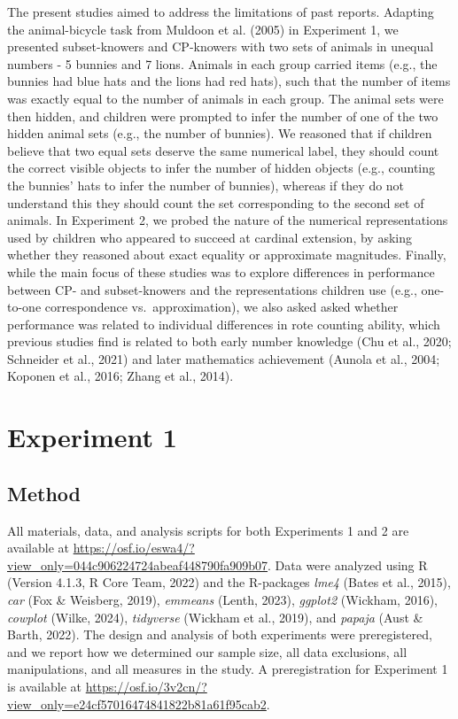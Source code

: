 \documentclass[
  man,floatsintext]{apa7}
\begin{document}
The present studies aimed to address the limitations of past reports. Adapting the animal-bicycle task from Muldoon et al. (2005) in Experiment 1, we presented subset-knowers and CP-knowers with two sets of animals in unequal numbers - 5 bunnies and 7 lions. Animals in each group carried items (e.g., the bunnies had blue hats and the lions had red hats), such that the number of items was exactly equal to the number of animals in each group. The animal sets were then hidden, and children were prompted to infer the number of one of the two hidden animal sets (e.g., the number of bunnies). We reasoned that if children believe that two equal sets deserve the same numerical label, they should count the correct visible objects to infer the number of hidden objects (e.g., counting the bunnies' hats to infer the number of bunnies), whereas if they do not understand this they should count the set corresponding to the second set of animals. In Experiment 2, we probed the nature of the numerical representations used by children who appeared to succeed at cardinal extension, by asking whether they reasoned about exact equality or approximate magnitudes. Finally, while the main focus of these studies was to explore differences in performance between CP- and subset-knowers and the representations children use (e.g., one-to-one correspondence vs.~approximation), we also asked asked whether performance was related to individual differences in rote counting ability, which previous studies find is related to both early number knowledge (Chu et al., 2020; Schneider et al., 2021) and later mathematics achievement (Aunola et al., 2004; Koponen et al., 2016; Zhang et al., 2014).

\section{Experiment 1}\label{experiment-1}

\subsection{Method}\label{method}

All materials, data, and analysis scripts for both Experiments 1 and 2 are available at \url{https://osf.io/eswa4/?view_only=044c906224724abeaf448790fa909b07}. Data were analyzed using R (Version 4.1.3, R Core Team, 2022) and the R-packages \emph{lme4} (Bates et al., 2015), \emph{car} (Fox \& Weisberg, 2019), \emph{emmeans} (Lenth, 2023), \emph{ggplot2} (Wickham, 2016), \emph{cowplot} (Wilke, 2024), \emph{tidyverse} (Wickham et al., 2019), and \emph{papaja} (Aust \& Barth, 2022). The design and analysis of both experiments were preregistered, and we report how we determined our sample size, all data exclusions, all manipulations, and all measures in the study. A preregistration for Experiment 1 is available at \url{https://osf.io/3v2cn/?view_only=e24cf57016474841822b81a61f95cab2}.
\end{document}
